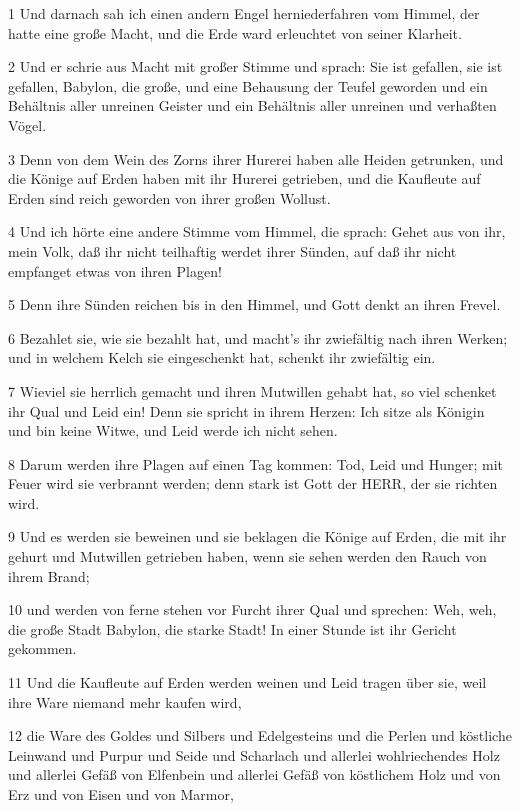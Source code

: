 \par 1 Und darnach sah ich einen andern Engel herniederfahren vom Himmel, der hatte eine große Macht, und die Erde ward erleuchtet von seiner Klarheit.
\par 2 Und er schrie aus Macht mit großer Stimme und sprach: Sie ist gefallen, sie ist gefallen, Babylon, die große, und eine Behausung der Teufel geworden und ein Behältnis aller unreinen Geister und ein Behältnis aller unreinen und verhaßten Vögel.
\par 3 Denn von dem Wein des Zorns ihrer Hurerei haben alle Heiden getrunken, und die Könige auf Erden haben mit ihr Hurerei getrieben, und die Kaufleute auf Erden sind reich geworden von ihrer großen Wollust.
\par 4 Und ich hörte eine andere Stimme vom Himmel, die sprach: Gehet aus von ihr, mein Volk, daß ihr nicht teilhaftig werdet ihrer Sünden, auf daß ihr nicht empfanget etwas von ihren Plagen!
\par 5 Denn ihre Sünden reichen bis in den Himmel, und Gott denkt an ihren Frevel.
\par 6 Bezahlet sie, wie sie bezahlt hat, und macht's ihr zwiefältig nach ihren Werken; und in welchem Kelch sie eingeschenkt hat, schenkt ihr zwiefältig ein.
\par 7 Wieviel sie herrlich gemacht und ihren Mutwillen gehabt hat, so viel schenket ihr Qual und Leid ein! Denn sie spricht in ihrem Herzen: Ich sitze als Königin und bin keine Witwe, und Leid werde ich nicht sehen.
\par 8 Darum werden ihre Plagen auf einen Tag kommen: Tod, Leid und Hunger; mit Feuer wird sie verbrannt werden; denn stark ist Gott der HERR, der sie richten wird.
\par 9 Und es werden sie beweinen und sie beklagen die Könige auf Erden, die mit ihr gehurt und Mutwillen getrieben haben, wenn sie sehen werden den Rauch von ihrem Brand;
\par 10 und werden von ferne stehen vor Furcht ihrer Qual und sprechen: Weh, weh, die große Stadt Babylon, die starke Stadt! In einer Stunde ist ihr Gericht gekommen.
\par 11 Und die Kaufleute auf Erden werden weinen und Leid tragen über sie, weil ihre Ware niemand mehr kaufen wird,
\par 12 die Ware des Goldes und Silbers und Edelgesteins und die Perlen und köstliche Leinwand und Purpur und Seide und Scharlach und allerlei wohlriechendes Holz und allerlei Gefäß von Elfenbein und allerlei Gefäß von köstlichem Holz und von Erz und von Eisen und von Marmor,
